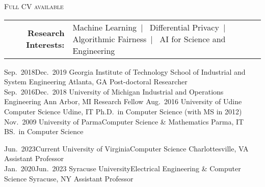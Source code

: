 \documentclass[localFont,alternative]{documentMETADATA}
\begin{document}
\makecvheader\sloppy\allowdisplaybreaks


	\makecvfooter
		{\textsc{}} %
		{\textsc{Full CV available  }}
		{\thepage}


	\begin{tabular}{r l} 
	{\bf Research Interests:} &
	{Machine Learning}~|~
	{Differential Privacy}~|~
	{Algorithmic Fairness}~|~
	{AI for Science and Engineering}
	\end{tabular}


\vspace{-6pt}
\begin{experiences}
  \job
    {Sep.~2018}{Dec.~2019}
    {Georgia Institute of Technology}
    {School of Industrial and System Engineering}
    {Atlanta, GA}
    {Post-doctoral Researcher}\\[-10pt]
  \job
    {Sep.~2016}{Dec.~2018}
    {University of Michigan}
    {Industrial and Operations Engineering}
    {Ann Arbor, MI}
    {Research Fellow}
  \job
    {}{Aug.~2016}
    {University of Udine}%
    {Computer Science}
    {Udine, IT}
    {Ph.D.~in Computer Science (with MS in 2012)}
  \job
    {}{Nov.~2009}
    {University of Parma}{Computer Science \& Mathematics}
    {Parma, IT}
    {BS.~in Computer Science}
\end{experiences}

\vspace{-6pt}
\begin{experiences}
  \job
    {Jun.~2023}{Current}
    {University of Virginia}{Computer Science}
    {Charlottesville, VA}
    {Assistant Professor}\\[-10pt]
  \job
    {Jan.~2020}{Jun.~2023}
    {Syracuse University}{Electrical Engineering \& Computer Science}
    {Syracuse, NY}
    {Assistant Professor}
\end{experiences}


\vspace{-6pt}
\end{document}
